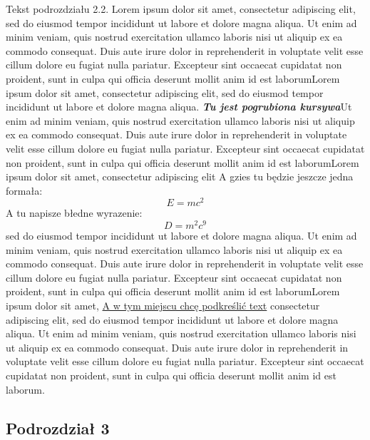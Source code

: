 \documentclass[12pt,a4paper,titlepage]{article}
\begin{document}
Tekst podrozdziału 2.2. Lorem ipsum dolor sit amet, consectetur adipiscing elit, sed do eiusmod tempor incididunt ut labore et dolore magna aliqua. Ut enim ad minim veniam, quis nostrud exercitation ullamco laboris nisi ut aliquip ex ea commodo consequat. Duis aute irure dolor in reprehenderit in voluptate velit esse cillum dolore eu fugiat nulla pariatur. Excepteur sint occaecat cupidatat non proident, sunt in culpa qui officia deserunt mollit anim id est laborumLorem ipsum dolor sit amet, consectetur adipiscing elit, sed do eiusmod tempor incididunt ut labore et dolore magna aliqua. \textbf{\textit{Tu jest pogrubiona kursywa}}Ut enim ad minim veniam, quis nostrud exercitation ullamco laboris nisi ut aliquip ex ea commodo consequat. Duis aute irure dolor in reprehenderit in voluptate velit esse cillum dolore eu fugiat nulla pariatur. Excepteur sint occaecat cupidatat non proident, sunt in culpa qui officia deserunt mollit anim id est laborumLorem ipsum dolor sit amet, consectetur adipiscing elit
A gzies tu będzie jeszcze jedna formała:
\[ E=mc^2 \]
A tu napisze błedne wyrazenie:
\[ D=m^2c^9 \]
sed do eiusmod tempor incididunt ut labore et dolore magna aliqua. Ut enim ad minim veniam, quis nostrud exercitation ullamco laboris nisi ut aliquip ex ea commodo consequat. Duis aute irure dolor in reprehenderit in voluptate velit esse cillum dolore eu fugiat nulla pariatur. Excepteur sint occaecat cupidatat non proident, sunt in culpa qui officia deserunt mollit anim id est laborumLorem ipsum dolor sit amet, \underline{A w tym miejscu chcę podkreślić text} consectetur adipiscing elit, sed do eiusmod tempor incididunt ut labore et dolore magna aliqua. Ut enim ad minim veniam, quis nostrud exercitation ullamco laboris nisi ut aliquip ex ea commodo consequat. Duis aute irure dolor in reprehenderit in voluptate velit esse cillum dolore eu fugiat nulla pariatur. Excepteur sint occaecat cupidatat non proident, sunt in culpa qui officia deserunt mollit anim id est laborum. 

\subsection{Podrozdział 3}
\end{document}
